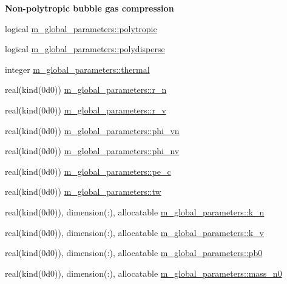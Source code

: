 \begin{Indent}\textbf{ Non-\/polytropic bubble gas compression}\par
\begin{DoxyCompactItemize}
\item 
logical \hyperlink{namespacem__global__parameters_a8d670f2f984167bae71b7b3f12d0908a}{m\+\_\+global\+\_\+parameters\+::polytropic}
\item 
logical \hyperlink{namespacem__global__parameters_a32791d9d5fef0213f01fc31713b17ae8}{m\+\_\+global\+\_\+parameters\+::polydisperse}
\item 
integer \hyperlink{namespacem__global__parameters_a17169a5387f8f1efd5ac34cb4eae7c81}{m\+\_\+global\+\_\+parameters\+::thermal}
\item 
real(kind(0d0)) \hyperlink{namespacem__global__parameters_ae818e88601b1dc579a87e7c0c8cd87cb}{m\+\_\+global\+\_\+parameters\+::r\+\_\+n}
\item 
real(kind(0d0)) \hyperlink{namespacem__global__parameters_af2ee1ad578115833bb6b8e9550eb5f18}{m\+\_\+global\+\_\+parameters\+::r\+\_\+v}
\item 
real(kind(0d0)) \hyperlink{namespacem__global__parameters_acc6771df62005731bbec282b0c9a5659}{m\+\_\+global\+\_\+parameters\+::phi\+\_\+vn}
\item 
real(kind(0d0)) \hyperlink{namespacem__global__parameters_a7dbd1ec1fd1ece4e997a825fa07785eb}{m\+\_\+global\+\_\+parameters\+::phi\+\_\+nv}
\item 
real(kind(0d0)) \hyperlink{namespacem__global__parameters_ac1375e5145e018847d9025e83e58b49d}{m\+\_\+global\+\_\+parameters\+::pe\+\_\+c}
\item 
real(kind(0d0)) \hyperlink{namespacem__global__parameters_aa77b0836fe22478b69e10e656ef7fcc2}{m\+\_\+global\+\_\+parameters\+::tw}
\item 
real(kind(0d0)), dimension(\+:), allocatable \hyperlink{namespacem__global__parameters_a555eda1318a218d37d1bdd8f4d57eaf2}{m\+\_\+global\+\_\+parameters\+::k\+\_\+n}
\item 
real(kind(0d0)), dimension(\+:), allocatable \hyperlink{namespacem__global__parameters_a1943ea5a5127e94a197afae57be95758}{m\+\_\+global\+\_\+parameters\+::k\+\_\+v}
\item 
real(kind(0d0)), dimension(\+:), allocatable \hyperlink{namespacem__global__parameters_a1097b95561b65a9035e5f9218de577f9}{m\+\_\+global\+\_\+parameters\+::pb0}
\item 
real(kind(0d0)), dimension(\+:), allocatable \hyperlink{namespacem__global__parameters_ae3701f74c9487c9e56c2a11fb6a52e40}{m\+\_\+global\+\_\+parameters\+::mass\+\_\+n0}

\end{DoxyCompactItemize}
\end{Indent}
